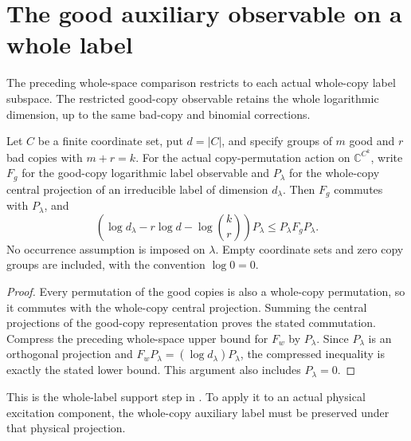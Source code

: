 \section{The good auxiliary observable on a whole label}
\label{sec:good_auxiliary_label_compression}

The preceding whole-space comparison restricts to each actual whole-copy
label subspace. The restricted good-copy observable retains the whole
logarithmic dimension, up to the same bad-copy and binomial corrections.

\begin{theorem}
\label{thm:good_auxiliary_label_compression}
\leanok
Let $C$ be a finite coordinate set, put $d=|C|$, and specify groups of $m$
good and $r$ bad copies with $m+r=k$. For the actual copy-permutation action
on $\mathbb C^{C^k}$, write $F_g$ for the good-copy logarithmic label
observable and $P_\lambda$ for the whole-copy central projection of an
irreducible label of dimension $d_\lambda$. Then $F_g$ commutes with
$P_\lambda$, and
\[
 \left(\log d_\lambda-r\log d-\log\binom{k}{r}\right)P_\lambda
       \le P_\lambda F_g P_\lambda.
\]
No occurrence assumption is imposed on $\lambda$. Empty coordinate sets
and zero copy groups are included, with the convention $\log0=0$.
\end{theorem}
\begin{proof}
\leanok
{}
Every permutation of the good copies is also a whole-copy permutation,
so it commutes with the whole-copy central projection. Summing the
central projections of the good-copy representation proves the stated
commutation. Compress the preceding whole-space upper bound for $F_w$
by $P_\lambda$. Since $P_\lambda$ is an orthogonal projection and
$F_wP_\lambda=(\log d_\lambda)P_\lambda$, the compressed inequality is
exactly the stated lower bound. This argument also includes
$P_\lambda=0$.
\end{proof}

This is the whole-label support step in
\cite[Section~7, equation \textup{(comparator:good-auxiliary)}]{OpenAI2026AreaLaw}.
To apply it to an actual physical excitation component, the whole-copy
auxiliary label must be preserved under that physical projection.
